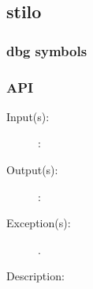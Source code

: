 %
%
%
%
%              

\subsection{stilo}
\label{stilo}

\subsubsection{dbg symbols}

\subsubsection{API}
\begin{description}
\label{stilo_}
\item[{\cfunc[]{stilo\_}{}}: ]
	\begin{description}\item[]
	\item[Input(s): ]
		\begin{description}\item[]
		\item[: ]
		\end{description}
	\item[Output(s): ]
		\begin{description}\item[]
		\item[: ]
		\end{description}
	\item[Exception(s): ]
		\begin{description}\item[]
		\item[.]
		\end{description}
	\item[Description: ]
	\end{description}
\end{description}
